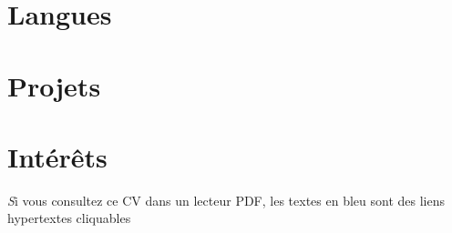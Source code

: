 \bigskip
\section{Langues}



\bigskip
\section[\nerdfont]{Projets}


\bigskip
\section{Intérêts}


\begin{center}
  \vfill
  \scriptsize
  {
    \textit
    Si vous consultez ce CV dans un lecteur PDF, {\color{blue-800}les textes en
        bleu} sont des liens hypertextes cliquables
  }
\end{center}

%
